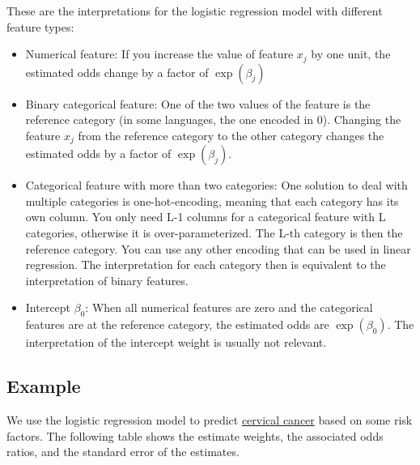 \documentclass[12pt,]{krantz}
\providecommand{\tightlist}{%
  \setlength{\itemsep}{0pt}\setlength{\parskip}{0pt}}
\begin{document}
These are the interpretations for the logistic regression model with
different feature types:

\begin{itemize}
\tightlist
\item
  Numerical feature: If you increase the value of feature \(x_{j}\) by
  one unit, the estimated odds change by a factor of \(\exp(\beta_{j})\)
\item
  Binary categorical feature: One of the two values of the feature is
  the reference category (in some languages, the one encoded in 0).
  Changing the feature \(x_{j}\) from the reference category to the
  other category changes the estimated odds by a factor of
  \(\exp(\beta_{j})\).
\item
  Categorical feature with more than two categories: One solution to
  deal with multiple categories is one-hot-encoding, meaning that each
  category has its own column. You only need L-1 columns for a
  categorical feature with L categories, otherwise it is
  over-parameterized. The L-th category is then the reference category.
  You can use any other encoding that can be used in linear regression.
  The interpretation for each category then is equivalent to the
  interpretation of binary features.
\item
  Intercept \(\beta_{0}\): When all numerical features are zero and the
  categorical features are at the reference category, the estimated odds
  are \(\exp(\beta_{0})\). The interpretation of the intercept weight is
  usually not relevant.
\end{itemize}

\subsection{Example}\label{example-1}

We use the logistic regression model to predict
\protect\hyperlink{cervical}{cervical cancer} based on some risk
factors. The following table shows the estimate weights, the associated
odds ratios, and the standard error of the estimates.
\end{document}
